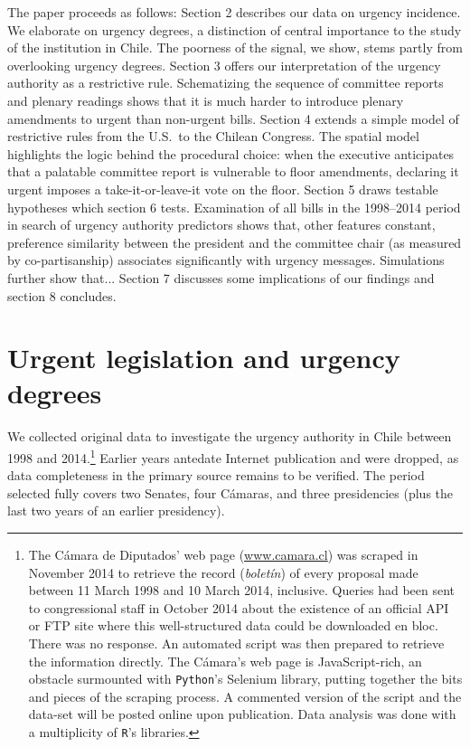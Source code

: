 \documentclass[letter,12pt]{article}
\newcommand{\emm}[1]{\todo[color=red!15, inline]{\textbf{EM:} #1}}
\begin{document}
The paper proceeds as follows: Section 2 describes our data on urgency incidence. We elaborate on urgency degrees, a distinction of central importance to the study of the institution in Chile. The poorness of the signal, we show, stems partly from overlooking urgency degrees. %
Section 3 offers our interpretation of the urgency authority as a restrictive rule. Schematizing the sequence of committee reports and plenary readings shows that it is much harder to introduce plenary amendments to urgent than non-urgent bills. Section 4 extends a simple model of restrictive rules from the U.S.\ to the Chilean Congress. The spatial model highlights the logic behind the procedural choice: when the executive anticipates that a palatable committee report is vulnerable to floor amendments, declaring it urgent imposes a take-it-or-leave-it vote on the floor. Section 5 draws testable hypotheses which section 6 tests. Examination of all bills in the 1998--2014 period in search of urgency authority predictors shows that, other features constant, preference similarity between the president and the committee chair (as measured by co-partisanship) associates significantly with urgency messages. Simulations further show that... Section 7 discusses some implications of our findings and section 8 concludes.


\section{Urgent legislation and urgency degrees}

We collected original data to investigate the urgency authority in Chile between 1998 and 2014.\footnote{The Cámara de Diputados' web page (\url{www.camara.cl}) was scraped in November 2014 to retrieve the record (\emph{boletín}) of every proposal made between 11 March 1998 and 10 March 2014, inclusive. Queries had been sent to congressional staff in October 2014 about the existence of an official API or FTP site where this well-structured data could be downloaded en bloc. There was no response. An automated script was then prepared to retrieve the information directly. The Cámara's web page is JavaScript-rich, an obstacle surmounted with \texttt{Python}'s Selenium library, putting together the bits and pieces of the scraping process. A commented version of the script and the data-set will be posted online upon publication. Data analysis was done with a multiplicity of \texttt{R}'s libraries.} Earlier years antedate Internet publication and were dropped, as data completeness in the primary source remains to be verified. The period selected fully covers two Senates, four Cámaras, and three presidencies (plus the last two years of an earlier presidency). 
\end{document}
